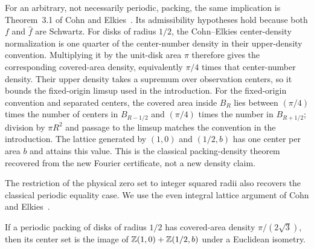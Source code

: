 For an arbitrary, not necessarily periodic, packing, the same implication
is Theorem~3.1 of Cohn and Elkies~\cite{CohnElkies2003}.  Its admissibility
hypotheses hold because both $f$ and $\widehat f$ are Schwartz.
For disks of radius $1/2$, the Cohn--Elkies center-density normalization is
one quarter of the center-number density in their upper-density convention.
Multiplying it by the unit-disk area $\pi$ therefore gives the corresponding
covered-area density, equivalently $\pi/4$ times that center-number density.
Their upper density takes a supremum over observation centers, so it bounds
the fixed-origin limsup used in the introduction.
For the fixed-origin convention and separated centers, the
covered area inside $B_R$ lies between $(\pi/4)$ times the number of centers
in $B_{R-1/2}$ and $(\pi/4)$ times the number in $B_{R+1/2}$; division by
$\pi R^2$ and passage to the limsup matches the convention in the
introduction.  The lattice generated by $(1,0)$ and $(1/2,b)$ has one center
per area $b$ and attains this value.  This is the classical packing-density
theorem recovered from the new Fourier certificate, not a new density claim.

The restriction of the physical zero set to integer squared radii also
recovers the classical periodic equality case.  We use the even integral
lattice argument of Cohn and Elkies~\cite[Section~8]{CohnElkies2003}.

\begin{corollary}\label{normalization:periodic-uniqueness}
If a periodic packing of disks of radius $1/2$ has covered-area density
$\pi/(2\sqrt3)$, then its center set is the image of
$\mathbb Z(1,0)+\mathbb Z(1/2,b)$ under a Euclidean isometry.
\end{corollary}

